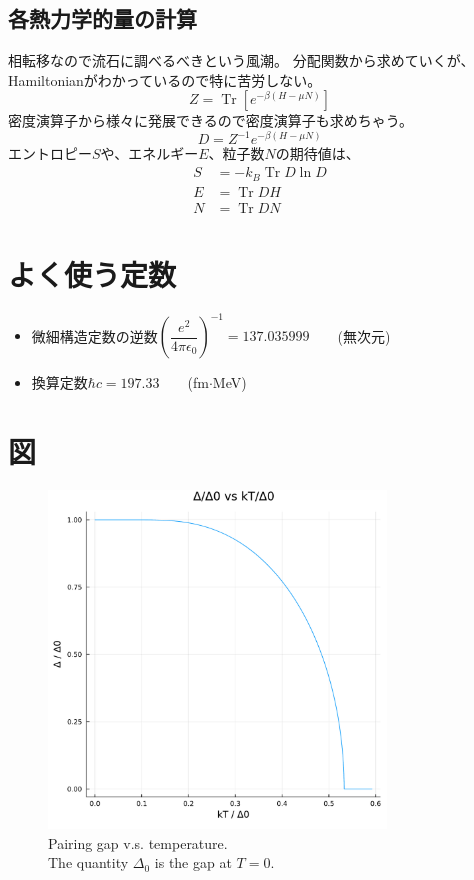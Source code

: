 \documentclass[a4paper,12pt]{jsreport}
\begin{document}
\section{各熱力学的量の計算}
相転移なので流石に調べるべきという風潮。
分配関数から求めていくが、Hamiltonianがわかっているので特に苦労しない。
\begin{equation}
  Z = \operatorname{Tr}\left[e^{-\beta(H-\mu N)}\right]
\end{equation}
密度演算子から様々に発展できるので密度演算子も求めちゃう。
\begin{equation}
  D = Z^{-1}e^{-\beta(H-\mu N)}
\end{equation}
エントロピー$S$や、エネルギー$E$、粒子数$N$の期待値は、
\begin{align}
  S &= -k_B\operatorname{Tr}D\ln D\\
  E &= \operatorname{Tr} DH\\
  N &= \operatorname{Tr} DN
\end{align}
\chapter{よく使う定数}
\begin{itemize}
  \item 微細構造定数の逆数$\left(\dfrac{e^2}{4\pi\epsilon_0}\right)^{-1}=137.035999\qquad$(無次元)
  \item 換算定数$\hbar c=197.33\qquad$(fm$\cdot$MeV)
\end{itemize}
\chapter{図}
\begin{figure}[H]
  \centering
  \includegraphics[width=0.8\textwidth]{FTBCS.pdf}
  \caption{Pairing gap v.s. temperature.\\ The quantity $\Delta_0$ is the gap at $T=0$.}
  \label{FTBCS}
\end{figure}
\end{document}
